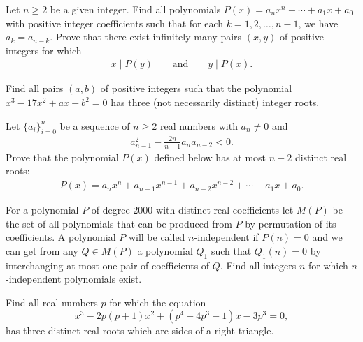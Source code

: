 \documentclass[12pt,a4paper]{memoir}
\theoremstyle{definition}
\begin{document}
\begin{question}[name={1997 Romania}]
	Let $n\geq 2$ be a given integer. Find all polynomials $P(x) = a_nx^n+\cdots+a_1x+a_0$ with positive integer coefficients such that for each $k=1,2,\dots,n-1$, we have $a_k=a_{n-k}$. Prove that there exist infinitely many pairs $(x,y)$ of positive integers for which
	\begin{align*}
		x \mid P(y) \qquad \text{and} \qquad y \mid P(x).
	\end{align*}
\end{question}


\begin{question}[name={1998 Austrian--Polish}]
	Find all pairs $(a,b)$ of positive integers such that the polynomial $x^3-17x^2+ax-b^2=0$ has three (not necessarily distinct) integer roots.
\end{question}

\begin{question}
	Let $\{a_i\}_{i=0}^{n}$ be a sequence of $n\geq 2$ real numbers with $a_n \neq 0$ and
	\begin{align*}
		a_{n-1}^2 - \frac{2n}{n-1}a_na_{n-2} < 0.
	\end{align*}
	Prove that the polynomial $P(x)$ defined below has at most $n-2$ distinct real roots:
	\begin{align*}
		P(x) = a_nx^n + a_{n-1}x^{n-1} + a_{n-2}x^{n-2} + \cdots + a_1 x + a_0.
	\end{align*}
\end{question}

\begin{question}[name={2000 IMO Shortlist}] 
	For a polynomial $ P$ of degree $2000$ with distinct real coefficients let $ M(P)$ be the set of all polynomials that can be produced from $ P$ by permutation of its coefficients. A polynomial $ P$ will be called $ n$-independent if $ P(n) = 0$ and we can get from any $ Q \in M(P)$ a polynomial $ Q_1$ such that $ Q_1(n) = 0$ by interchanging at most one pair of coefficients of $ Q.$ Find all integers $ n$ for which $ n$-independent polynomials exist.
\end{question}

\begin{question}[name={1995 Czech And Slovak Mathematical Olympiad}] 
	Find all real numbers $p$ for which the equation \[x^3 -2p(p+1)x^2+(p^4 +4p^3 -1)x-3p^3 = 0,\] has three distinct real roots which are sides of a right triangle.
\end{question}
\end{document}
